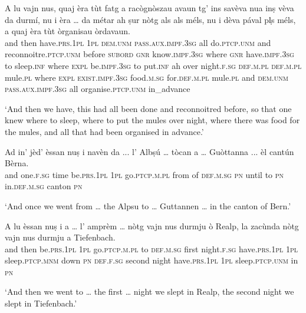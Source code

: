 \begin{linenumbers}
\gll A lu vajn nus, quaj èra tùt fatg a racògnòszau avaun tg’ ins savèva nua inṣ vèva da durmí, nu i èra … da métar ah ṣur nòtg als als méls, nu i dèva pával pl̩s méls, a quaj èra tùt òrganisau òrdavaun. \\
and then have.\textsc{prs.1pl} \textsc{1pl} \textsc{dem.unm} \textsc{pass.aux.impf.3sg} all do.\textsc{ptcp.unm} and  reconnoitre.\textsc{ptcp.unm} before \textsc{subord} \textsc{gnr}  know.\textsc{impf.3sg} where \textsc{gnr} have.\textsc{impf.3sg} to sleep.\textsc{inf} where \textsc{expl} be.\textsc{impf.3sg} {} to put.\textsc{inf} ah over night.\textsc{f.sg} \textsc{def.m.pl} \textsc{def.m.pl} mule.\textsc{pl} where \textsc{expl} \textsc{exist.impf.3sg} food.\textsc{m.sg} for.\textsc{def.m.pl} mule.\textsc{pl} and \textsc{dem.unm} \textsc{pass.aux.impf.3sg} all organise.\textsc{ptcp.unm} in\_advance \\
\end{linenumbers}
\medskip
\glt `And then we have, this had all been done and reconnoitred before, so that one knew where to sleep, where to put the mules over night, where there was food for the mules, and all that had been organised in advance.'
\medskip

\begin{linenumbers}
\gll  Ad in’ jèd’ èssan nuṣ i navèn da ... l’ Albṣú … tòcan a … Guòttanna ... èl\footnotemark{} cantún Bèrna.  \\
and one.\textsc{f.sg} time be.\textsc{prs.1pl} \textsc{1pl} go.\textsc{ptcp.m.pl} from of {} \textsc{def.m.sg} \textsc{pn} {} until to {} \textsc{pn} {} in.\textsc{def.m.sg} canton \textsc{pn}\\
\end{linenumbers}
\medskip
\glt `And once we went from … the Alpsu to … Guttannen … in the canton of Bern.'
\medskip

\begin{linenumbers}
\gll  A lu èssan nuṣ i a … l’ amprèm … nòtg vajn nus durmju ò Realp, la zacùnda nòtg vajn nus durmju a Tiefenbach.  \\
and then be.\textsc{prs.1pl} \textsc{1pl} go.\textsc{ptcp.m.pl} to {} \textsc{def.m.sg} first {} night.\textsc{f.sg} have.\textsc{prs.1pl} \textsc{1pl} sleep.\textsc{ptcp.mnm} down \textsc{pn} \textsc{def.f.sg} second night have.\textsc{prs.1pl} \textsc{1pl}  sleep.\textsc{ptcp.unm} in \textsc{pn}\\
\end{linenumbers}
\medskip
\glt `And then we went to … the first … night we slept in Realp, the second night we slept in Tiefenbach.'
\medskip

